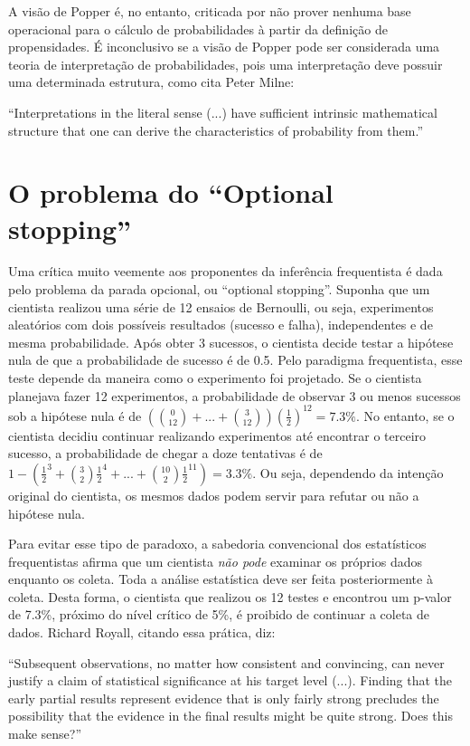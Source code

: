 A visão de Popper é, no entanto, criticada por não prover nenhuma base operacional para o cálculo de probabilidades à partir
da definição de propensidades. É inconclusivo se a visão de Popper pode ser considerada uma teoria de interpretação
de probabilidades, pois uma interpretação deve possuir uma determinada estrutura, como cita Peter Milne:

``Interpretations in the literal sense (...) have sufficient intrinsic mathematical structure that one can derive
the characteristics of probability from them.''\citep{Milne93}

\section {O problema do ``Optional stopping''}

Uma crítica muito veemente aos proponentes da inferência frequentista é dada pelo problema da parada opcional, ou 
``optional stopping''. Suponha que um cientista realizou uma série de 12 ensaios de Bernoulli, ou seja, experimentos aleatórios
com dois possíveis resultados (sucesso e falha), independentes e de mesma probabilidade. Após obter 3 sucessos, o cientista
decide testar a hipótese nula de que a probabilidade de sucesso é de 0.5. Pelo paradigma frequentista, esse teste depende
da maneira como o experimento foi projetado. Se o cientista planejava fazer 12 experimentos, a probabilidade de observar 3
ou menos sucessos sob a hipótese nula é de $ \left( {0 \choose 12} + ... + {3 \choose 12}\right) (\frac{1}{2})^{12} = 7.3\%$. No entanto, se o cientista decidiu continuar realizando experimentos até
encontrar o terceiro sucesso, a probabilidade de chegar a doze tentativas é de 
$1 - \left( \frac{1}{2}^3 + {3 \choose 2} \frac{1}{2}^4 + ... + {10 \choose 2} \frac{1}{2}^{11}\right) = 3.3\%$. Ou seja,
dependendo da intenção original do cientista, os mesmos dados podem servir para refutar ou não a hipótese nula.

Para evitar esse tipo de  paradoxo, a sabedoria convencional dos estatísticos frequentistas afirma que um cientista {\em não pode}
examinar os próprios dados enquanto os coleta. Toda a análise estatística deve ser feita posteriormente à coleta. 
Desta forma, o cientista que realizou os 12 testes e encontrou um p-valor de 7.3\%, próximo do nível crítico de 5\%, é
proibido de continuar a coleta de dados. Richard Royall, citando essa prática, diz:

``Subsequent observations, no matter how consistent and convincing, can never justify a claim of statistical significance
at his target level (...). Finding that the early partial results represent evidence that is only fairly strong precludes
the possibility that the evidence in the final results might be quite strong. Does this make sense?'' \citep{Royall97}

